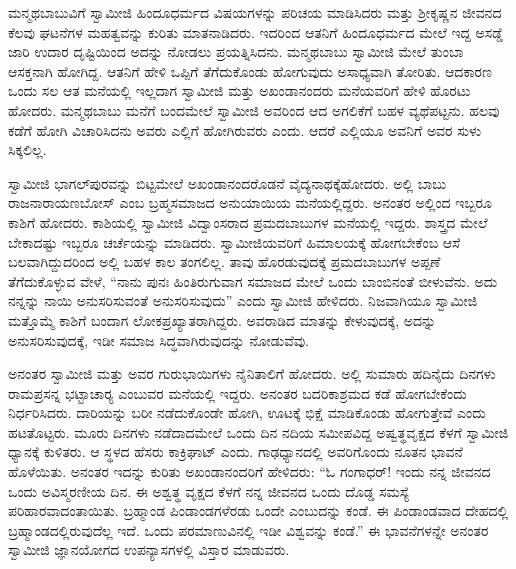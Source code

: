 ಮನ್ಮಥಬಾಬುವಿಗೆ ಸ್ವಾಮೀಜಿ ಹಿಂದೂಧರ್ಮದ ವಿಷಯಗಳನ್ನು ಪರಿಚಯ ಮಾಡಿಸಿದರು ಮತ್ತು ಶ‍್ರೀಕೃಷ್ಣನ ಜೀವನದ ಕೆಲವು ಘಟನೆಗಳ ಮಹತ್ವವನ್ನು ಕುರಿತು ಮಾತನಾಡಿದರು. ಇದರಿಂದ ಆತನಿಗೆ ಹಿಂದೂಧರ್ಮದ ಮೇಲೆ ಇದ್ದ ಅಸಡ್ಡೆ ಜಾರಿ ಉದಾರ ದೃಷ್ಟಿಯಿಂದ ಅದನ್ನು ನೋಡಲು ಪ್ರಯತ್ನಿಸಿದನು. ಮನ್ಮಥಬಾಬು ಸ್ವಾಮೀಜಿ ಮೇಲೆ ತುಂಬಾ ಆಸಕ್ತನಾಗಿ ಹೋಗಿದ್ದ. ಆತನಿಗೆ ಹೇಳಿ ಒಪ್ಪಿಗೆ ತೆಗೆದುಕೊಂಡು ಹೋಗುವುದು ಅಸಾಧ್ಯವಾಗಿ ತೋರಿತು. ಆದಕಾರಣ ಒಂದು ಸಲ ಆತ ಮನೆಯಲ್ಲಿ ಇಲ್ಲದಾಗ ಸ್ವಾಮೀಜಿ ಮತ್ತು ಅಖಂಡಾನಂದರು ಮನೆಯವರಿಗೆ ಹೇಳಿ ಹೊರಟು ಹೋದರು. ಮನ್ಮಥಬಾಬು ಮನೆಗೆ ಬಂದಮೇಲೆ ಸ್ವಾಮೀಜಿ ಅವರಿಂದ ಆದ ಅಗಲಿಕೆಗೆ ಬಹಳ ವ್ಯಥೆಪಟ್ಟನು. ಹಲವು ಕಡೆಗೆ ಹೋಗಿ ವಿಚಾರಿಸಿದನು ಅವರು ಎಲ್ಲಿಗೆ ಹೋಗಿರುವರು ಎಂದು. ಆದರೆ ಎಲ್ಲಿಯೂ ಅವನಿಗೆ ಅವರ ಸುಳು ಸಿಕ್ಕಲಿಲ್ಲ. 

 ಸ್ವಾಮೀಜಿ ಭಾಗಲ್‍ಪುರವನ್ನು ಬಿಟ್ಟಮೇಲೆ ಅಖಂಡಾನಂದರೊಡನೆ ವೈದ್ಯನಾಥಕ್ಕೆ\break ಹೋದರು. ಅಲ್ಲಿ ಬಾಬು ರಾಜನಾರಾಯಣಬೋಸ್ ಎಂಬ ಬ್ರಹ್ಮಸಮಾಜದ ಅನುಯಾಯಿಯ ಮನೆಯಲ್ಲಿದ್ದರು. ಅನಂತರ ಅಲ್ಲಿಂದ ಇಬ್ಬರೂ ಕಾಶಿಗೆ ಹೋದರು. ಕಾಶಿಯಲ್ಲಿ ಸ್ವಾಮೀಜಿ ವಿದ್ವಾಂಸರಾದ ಪ್ರಮದಬಾಬುಗಳ ಮನೆಯಲ್ಲಿ ಇದ್ದರು. ಶಾಸ್ತ್ರದ ಮೇಲೆ ಬೇಕಾದಷ್ಟು ಇಬ್ಬರೂ ಚರ್ಚೆಯನ್ನು ಮಾಡಿದರು. ಸ್ವಾಮೀಜಿಯವರಿಗೆ ಹಿಮಾಲಯಕ್ಕೆ ಹೋಗಬೇಕೆಂಬ ಆಸೆ ಬಲವಾಗಿದ್ದುದರಿಂದ ಅಲ್ಲಿ ಬಹಳ ಕಾಲ ತಂಗಲಿಲ್ಲ. ತಾವು ಹೊರಡುವುದಕ್ಕೆ ಪ್ರಮದಬಾಬುಗಳ ಅಪ್ಪಣೆ ತೆಗೆದುಕೊಳ್ಳುವ ವೇಳೆ, “ನಾನು ಪುನಃ ಹಿಂತಿರುಗುವಾಗ ಸಮಾಜದ ಮೇಲೆ ಒಂದು ಬಾಂಬಿನಂತೆ ಬೀಳುವೆನು. ಅದು ನನ್ನನ್ನು ನಾಯಿ ಅನುಸರಿಸುವಂತೆ ಅನುಸರಿಸುವುದು” ಎಂದು ಸ್ವಾಮೀಜಿ ಹೇಳಿದರು. ನಿಜವಾಗಿಯೂ ಸ್ವಾಮೀಜಿ ಮತ್ತೊಮ್ಮೆ ಕಾಶಿಗೆ ಬಂದಾಗ ಲೋಕಪ್ರಖ್ಯಾತರಾಗಿದ್ದರು. ಅವರಾಡಿದ ಮಾತನ್ನು ಕೇಳುವುದಕ್ಕೆ, ಅದನ್ನು ಅನುಸರಿಸುವುದಕ್ಕೆ, ಇಡೀ ಸಮಾಜ ಸಿದ್ಧವಾಗಿರುವುದನ್ನು ನೋಡುವೆವು. 

ಅನಂತರ ಸ್ವಾಮೀಜಿ ಮತ್ತು ಅವರ ಗುರುಭಾಯಿಗಳು ನೈನಿತಾಲಿಗೆ ಹೋದರು. ಅಲ್ಲಿ ಸುಮಾರು ಹದಿನೈದು ದಿನಗಳು ರಾಮಪ್ರಸನ್ನ ಭಟ್ಟಾಚಾರ‍್ಯ ಎಂಬುವರ ಮನೆಯಲ್ಲಿ ಇದ್ದರು. ಅನಂತರ ಬದರಿಕಾಶ್ರಮದ ಕಡೆ ಹೋಗಬೇಕೆಂದು ನಿರ್ಧರಿಸಿದರು. ದಾರಿಯನ್ನು ಬರೀ ನಡೆದುಕೊಂಡೇ ಹೋಗಿ, ಊಟಕ್ಕೆ ಭಿಕ್ಷೆ ಮಾಡಿಕೊಂಡು ಹೋಗುತ್ತೇವೆ ಎಂದು ಹಟತೊಟ್ಟರು. ಮೂರು ದಿನಗಳು ನಡೆದಾದಮೇಲೆ ಒಂದು ದಿನ ನದಿಯ ಸಮೀಪವಿದ್ದ ಅಷ್ವತ್ಥವೃಕ್ಷದ ಕೆಳಗೆ ಸ್ವಾಮೀಜಿ ಧ್ಯಾನಕ್ಕೆ ಕುಳಿತರು. ಆ ಸ್ಥಳದ ಹೆಸರು ಕಾಕ್ರಿಘಾಟ್ ಎಂದು. ಗಾಢಧ್ಯಾನದಲ್ಲಿ ಅವರಿಗೊಂದು ನೂತನ ಭಾವನೆ ಹೊಳೆಯಿತು. ಅನಂತರ ಇದನ್ನು ಕುರಿತು ಅಖಂಡಾನಂದರಿಗೆ ಹೇಳಿದರು: “ಓ ಗಂಗಾಧರ್! ಇಂದು ನನ್ನ ಜೀವನದ ಒಂದು ಅವಿಸ್ಮರಣೀಯ ದಿನ. ಈ ಅಶ್ವತ್ಥ ವೃಕ್ಷದ ಕೆಳಗೆ ನನ್ನ ಜೀವನದ ಒಂದು ದೊಡ್ಡ ಸಮಸ್ಯೆ ಪರಿಹಾರವಾದಂತಾಯಿತು. ಬ್ರಹ್ಮಾಂಡ ಪಿಂಡಾಂಡಗಳೆರಡು ಒಂದೇ ಎಂಬುದನ್ನು ಕಂಡೆ. ಈ ಪಿಂಡಾಂಡವಾದ ದೇಹದಲ್ಲಿ ಬ್ರಹ್ಮಾಂಡದಲ್ಲಿರುವುದೆಲ್ಲ ಇದೆ. ಒಂದು ಪರಮಾಣುವಿನಲ್ಲಿ ಇಡೀ ವಿಶ್ವವನ್ನು ಕಂಡೆ.” ಈ ಭಾವನೆಗಳನ್ನೇ ಅನಂತರ ಸ್ವಾಮೀಜಿ ಜ್ಞಾನಯೋಗದ ಉಪನ್ಯಾಸಗಳಲ್ಲಿ ವಿಸ್ತಾರ ಮಾಡುವರು. 

